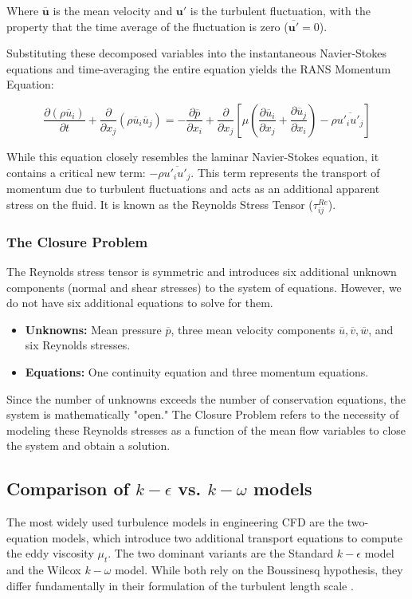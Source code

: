 Where $\overline{\mathbf{u}}$ is the mean velocity and $\mathbf{u}'$ is the turbulent fluctuation, with the property that the time average of the fluctuation is zero ($\overline{\mathbf{u}'} = 0$).

Substituting these decomposed variables into the instantaneous Navier-Stokes equations and time-averaging the entire equation yields the RANS Momentum Equation:

\begin{equation}
    \frac{\partial (\rho \overline{u}_i)}{\partial t} + \frac{\partial}{\partial x_j} (\rho \overline{u}_i \overline{u}_j) = -\frac{\partial \overline{p}}{\partial x_i} + \frac{\partial}{\partial x_j} \left[ \mu \left( \frac{\partial \overline{u}_i}{\partial x_j} + \frac{\partial \overline{u}_j}{\partial x_i} \right) - \rho \overline{u'_i u'_j} \right]
\end{equation}

While this equation closely resembles the laminar Navier-Stokes equation, it contains a critical new term: $-\rho \overline{u'_i u'_j}$. This term represents the transport of momentum due to turbulent fluctuations and acts as an additional apparent stress on the fluid. It is known as the Reynolds Stress Tensor ($\tau_{ij}^{Re}$). 

\subsubsection*{The Closure Problem}
The Reynolds stress tensor is symmetric and introduces six additional unknown components (normal and shear stresses) to the system of equations. However, we do not have six additional equations to solve for them.
\begin{itemize}
    \item \textbf{Unknowns:} Mean pressure $\overline{p}$, three mean velocity components $\overline{u}, \overline{v}, \overline{w}$, and six Reynolds stresses.
    \item \textbf{Equations:} One continuity equation and three momentum equations.
\end{itemize}

Since the number of unknowns exceeds the number of conservation equations, the system is mathematically "open." The Closure Problem refers to the necessity of modeling these Reynolds stresses as a function of the mean flow variables to close the system and obtain a solution.

\subsection{Comparison of $k-\epsilon$ vs. $k-\omega$ models}
The most widely used turbulence models in engineering CFD are the two-equation models, which introduce two additional transport equations to compute the eddy viscosity $\mu_t$. The two dominant variants are the Standard $k-\epsilon$ model and the Wilcox $k-\omega$ model. While both rely on the Boussinesq hypothesis, they differ fundamentally in their formulation of the turbulent length scale \cite{versteeg2007cfd}.

